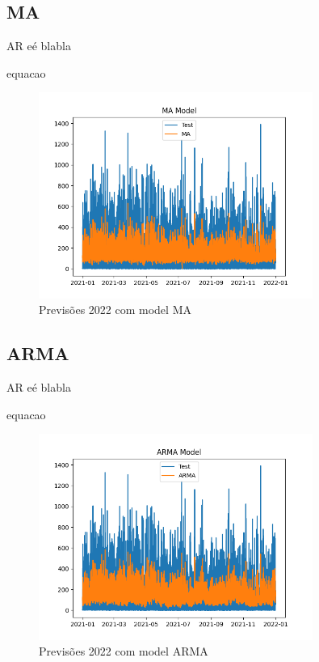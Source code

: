 \subsection{MA}

AR eé blabla

equacao

\begin{figure}[H]
    \centering
    \includegraphics[width=0.8\textwidth]{../plots/MA_model.png}
    \caption{Previsões 2022 com model MA}
    \label{fig:MA_model}
\end{figure}
  
\subsection{ARMA}

AR eé blabla

equacao

\begin{figure}[H]
    \centering
    \includegraphics[width=0.8\textwidth]{../plots/ARMA_model.png}
    \caption{Previsões 2022 com model ARMA}
    \label{fig:ARMA_model}
\end{figure}

